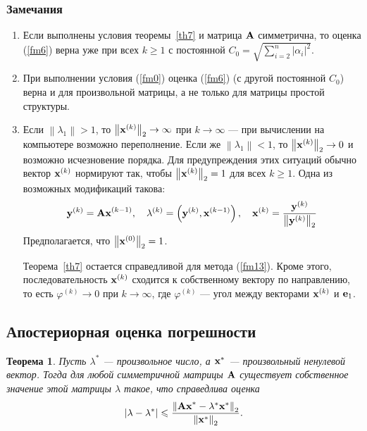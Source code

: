 \documentclass[12pt]{article}
\newtheorem{theorem}{Теорема}
\begin{document}
	\subsubsection*{Замечания}
	\begin{enumerate}
		\item Если выполнены условия теоремы~\ref{th7} и матрица $\bold{A}$ симметрична, то оценка (\ref{fm6}) верна уже при всех $k\geqslant 1$ с постоянной $C_0=\sqrt{\sum_{i=2}^{n}\left|\alpha_i\right|^2}$.
		\item При выполнении условия (\ref{fm0}) оценка (\ref{fm6}) (с другой постоянной $C_0$) верна и для произвольной матрицы, а не только для матрицы простой структуры.
		\item Если $\left\|\lambda_1\right\|>1$, то $\left\|\bold{x}^{\left(k\right)}\right\|_2\rightarrow \infty$ при $k\rightarrow\infty$ --- при вычислении на компьютере возможно переполнение. Если же $\left\|\lambda_1\right\|<1$, то $\left\|\bold{x}^{\left(k\right)}\right\|_2\rightarrow 0$ и возможно исчезновение порядка. Для предупреждения этих ситуаций обычно вектор $\bold{x}^{\left(k\right)}$ нормируют так, чтобы $\left\|\bold{x}^{\left(k\right)}\right\|_2=1$ для всех $k\geqslant 1$. Одна из возможных модификаций такова:
		\begin{equation}
			\bold{y}^{\left(k\right)}=\bold{Ax}^{\left(k-1\right)},\quad \lambda^{\left(k\right)}=\left(\bold{y}^{\left(k\right)},\bold{x}^{\left(k-1\right)}\right),\quad \bold{x}^{\left(k\right)}=\frac{\bold{y}^{\left(k\right)}}{\left\|\bold{y}^{\left(k\right)}\right\|_2}\label{fm23}
		\end{equation}
		Предполагается, что $\left\|\bold{x}^{\left(0\right)}\right\|_2=1$.\label{fm13}
		
		Теорема~\ref{th7} остается справедливой для метода (\ref{fm13}). Кроме этого, последовательность $\bold{x}^{\left(k\right)}$ сходится к собственному вектору по направлению, то есть $\varphi^{\left(k\right)}\rightarrow 0$ при $k\rightarrow\infty$, где $\varphi^{\left(k\right)}$ --- угол между векторами $\bold{x}^{\left(k\right)}$ и $\bold{e}_1$.
	\end{enumerate}
	
	\subsection*{Апостериорная оценка погрешности}
	
	\begin{theorem}
		Пусть $\lambda^{*}$ --- произвольное число, а $\bold{x}^{*}$ --- произвольный ненулевой вектор. Тогда для любой симметричной матрицы $\bold{A}$ существует собственное значение этой матрицы $\lambda$ такое, что справедлива оценка
		\begin{equation}
			\left|\lambda-\lambda^{*}\right|\leqslant\frac{\left\|\bold{Ax}^{*}-\lambda^{*}\bold{x}^{*}\right\|_2}{\left\|\bold{x}^{*}\right\|_2}.\label{fm14}
		\end{equation}
	\end{theorem}
	
\end{document}

